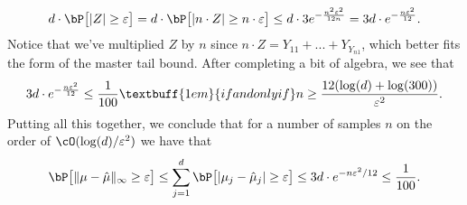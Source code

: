 \begin{homework}[e]
\begin{prf}
    \begin{align*}
      d\cdot \bP\big[|Z|\geq \epsilon\big] = d\cdot \bP\big[|n\cdot Z|\geq n\cdot \epsilon\big] \leq d \cdot 3e^{-\frac{n^2\epsilon^2}{12n}} = 3d\cdot e^{-\frac{n\epsilon^2}{12}}.
    \end{align*}
    Notice that we've multiplied $Z$ by $n$ since $n\cdot Z = Y_{11} + ... + Y_{Y_{n1}}$, which better fits the form of the master tail bound. After completing a bit of algebra, we see that
    \begin{align*}
      3d\cdot e^{-\frac{n\epsilon^2}{12}} \leq \frac{1}{100} \textbuff{1em}{if and only if} n \geq \frac{12(\log(d) + \log(300))}{\epsilon^2}.
    \end{align*}
    Putting all this together, we conclude that for a number of samples $n$ on the order of $\cO(\log(d)/\epsilon^2)$ we have that
    \begin{align*}
      \bP\big[\|\mu - \hat\mu\|_\infty \geq \epsilon\big]  \leq \sum_{j = 1}^d \bP\big[|\mu_j - \hat\mu_j| \geq \epsilon\big] \leq 3d\cdot e^{-n\epsilon^2/12} \leq \frac{1}{100}.
    \end{align*}

    \bigskip


\end{prf}
\end{homework}
